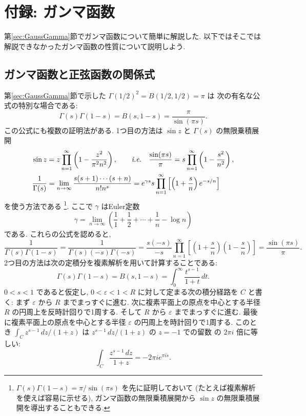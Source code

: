 \documentclass[12pt,twoside]{jarticle}
\newcommand\eps{\varepsilon}
\theoremstyle{jplain}
\theoremstyle{jplain}
\theoremstyle{jplain}
\numberwithin{theorem}{section}
\numberwithin{equation}{section}
\numberwithin{figure}{section}
\numberwithin{table}{section}
\newcommand\secref[1]{第\ref{#1}節}
\begin{document}

\section{付録: ガンマ函数}

\secref{sec:GaussGamma}でガンマ函数について簡単に解説した.
以下ではそこでは解説できなかったガンマ函数の性質について説明しよう.

\subsection{ガンマ函数と正弦函数の関係式}

\secref{sec:GaussGamma}で示した $\Gamma(1/2)^2=B(1/2,1/2)=\pi$ は
次の有名な公式の特別な場合である:
\[
\Gamma(s)\Gamma(1-s)=B(s,1-s)=\frac{\pi}{\sin(\pi s)}.
\]
この公式にも複数の証明法がある. 
1つ目の方法は $\sin z$ と $\Gamma(s)$ の無限乗積展開
\begin{align*}
&
\sin z = z\prod_{n=1}^\infty\left(1-\frac{z^2}{\pi^2 n^2}\right),
\qquad\text{{\it i.e.}}\quad
\frac{\sin(\pi s)}{\pi}=s\prod_{n=1}^\infty\left(1-\frac{s^2}{n^2}\right),
\\ &
\frac{1}{\Gamma(s)}
=\lim_{n\to\infty}\frac{s(s+1)\cdots(s+n)}{n!n^s}
=e^{\gamma s}s\prod_{n=1}^\infty\left[ \left(1+\frac{s}{n}\right)e^{-s/n} \right]
\end{align*}
を使う方法である%
\footnote{$\Gamma(s)\Gamma(1-s)=\pi/\sin(\pi s)$ を先に証明しておいて
(たとえば複素解析を使えば容易に示せる), 
ガンマ函数の無限乗積展開から $\sin z$ の無限乗積展開を導出することもできる.}. 
ここで $\gamma$ はEuler定数
\[
\gamma=\lim_{n\to\infty}\left(\frac11+\frac12+\cdots+\frac1n-\log n\right)
\]
である. これらの公式を認めると,
\[
\frac{1}{\Gamma(s)\Gamma(1-s)}
=\frac{1}{\Gamma(s)(-s)\Gamma(-s)}
=\frac{s(-s)}{-s}\prod_{n=1}^\infty\left[\left(1+\frac{s}{n}\right)\left(1-\frac{s}{n}\right)\right]
=\frac{\sin(\pi s)}{\pi}.
\]
2つ目の方法は次の定積分を複素解析を用いて計算することである:
\[
\Gamma(s)\Gamma(1-s)=B(s,1-s) = \int_0^\infty \frac{t^{s-1}}{1+t}\,dt.
\]
$0<s<1$ であると仮定し, $0<\eps<1<R$ に対して定まる次の積分経路を $C$ と書く:
まず $\eps$ から $R$ までまっすぐに進む. 
次に複素平面上の原点を中心とする半径 $R$ の円周上を反時計回りで1周する.
そして $R$ から $\eps$ までまっすぐに進む.
最後に複素平面上の原点を中心とする半径 $\eps$ の円周上を時計回りで1周する.
このとき $\int_C z^{s-1}\,dz/(1+z)$ は $z^{s-1}\,dz/(1+z)$ の $z=-1$ での留数
の $2\pi i$ 倍に等しい:
\[
\int_C \frac{z^{s-1}\,dz}{1+z} = - 2\pi i e^{\pi i s}.
\]
\end{document}
